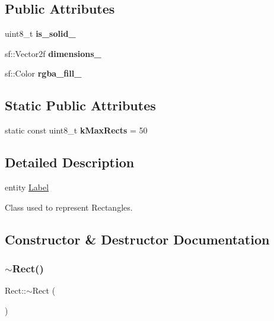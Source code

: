 \subsection*{Public Attributes}
\begin{DoxyCompactItemize}
\item 
\mbox{\label{class_rect_a898ebf0731c53c824582d4b1930b9e90}} 
uint8\+\_\+t {\bfseries is\+\_\+solid\+\_\+}
\item 
\mbox{\label{class_rect_abb92a0e14f750712887e2061866a52bd}} 
sf\+::\+Vector2f {\bfseries dimensions\+\_\+}
\item 
\mbox{\label{class_rect_a6af011eb6f16dabee8eff47e0772260e}} 
sf\+::\+Color {\bfseries rgba\+\_\+fill\+\_\+}
\end{DoxyCompactItemize}
\subsection*{Static Public Attributes}
\begin{DoxyCompactItemize}
\item 
\mbox{\label{class_rect_a18981822ae235d9ed80b6dd9ba257fcc}} 
static const uint8\+\_\+t {\bfseries k\+Max\+Rects} = 50
\end{DoxyCompactItemize}


\subsection{Detailed Description}
entity \hyperlink{class_label}{Label}

Class used to represent Rectangles. 

\subsection{Constructor \& Destructor Documentation}
\mbox{\label{class_rect_af5c075b863024c3e39add95e07d10f39}} 
\subsubsection{\texorpdfstring{$\sim$\+Rect()}{~Rect()}}
{\footnotesize\ttfamily Rect\+::$\sim$\+Rect (\begin{DoxyParamCaption}{ }\end{DoxyParamCaption})}

